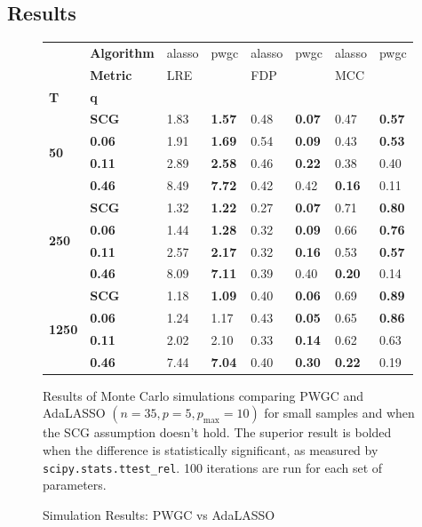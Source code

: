 \documentclass{statsoc}
\begin{document}
\subsection{Results}
\begin{figure}[!h]
  \centering
  \caption{Simulation Results: PWGC vs AdaLASSO}
  \label{tab:simulation_table}

  \begin{tabular}{|ll||ll|ll|ll|}
    \toprule
    &\textbf{Algorithm}&alasso&pwgc&alasso&pwgc&alasso&pwgc\\
    &\textbf{Metric}&LRE&&FDP&&MCC&\\
    \textbf{T}&\textbf{q}&&&&&&\\
    \midrule
    \multirow{4}{*}{\textbf{50}}
    &\textbf{SCG}&1.83&\textbf{1.57}&0.48&\textbf{0.07}&0.47&\textbf{0.57}\\
    &\textbf{0.06}&1.91&\textbf{1.69}&0.54&\textbf{0.09}&0.43&\textbf{0.53}\\
    &\textbf{0.11}&2.89&\textbf{2.58}&0.46&\textbf{0.22}&0.38&0.40\\
    &\textbf{0.46}&8.49&\textbf{7.72}&0.42&0.42&\textbf{0.16}&0.11\\
    \midrule
    \multirow{4}{*}{\textbf{250}}
    &\textbf{SCG}&1.32&\textbf{1.22}&0.27&\textbf{0.07}&0.71&\textbf{0.80}\\
    &\textbf{0.06}&1.44&\textbf{1.28}&0.32&\textbf{0.09}&0.66&\textbf{0.76}\\
    &\textbf{0.11}&2.57&\textbf{2.17}&0.32&\textbf{0.16}&0.53&\textbf{0.57}\\
    &\textbf{0.46}&8.09&\textbf{7.11}&0.39&0.40&\textbf{0.20}&0.14\\
    \midrule
    \multirow{4}{*}{\textbf{1250}}
    &\textbf{SCG}&1.18&\textbf{1.09}&0.40&\textbf{0.06}&0.69&\textbf{0.89}\\
    &\textbf{0.06}&1.24&1.17&0.43&\textbf{0.05}&0.65&\textbf{0.86}\\
    &\textbf{0.11}&2.02&2.10&0.33&\textbf{0.14}&0.62&0.63\\
    &\textbf{0.46}&7.44&\textbf{7.04}&0.40&\textbf{0.30}&\textbf{0.22}&0.19\\
    \bottomrule
  \end{tabular}

  {\footnotesize Results of Monte Carlo simulations comparing PWGC and
    AdaLASSO $(n = 35, p = 5, p_{\text{max}} = 10)$ for small
    samples and when the SCG assumption doesn't hold.  The superior
    result is bolded when the difference is statistically
    significant, as measured by \texttt{scipy.stats.ttest\_rel}.
    100 iterations are run for each
    set of parameters.\\

}
\end{figure}
\end{document}
